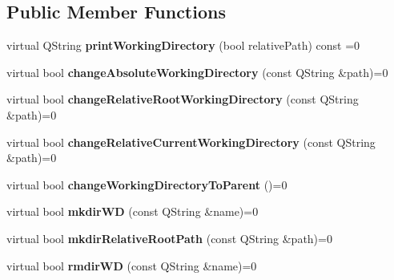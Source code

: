\subsection*{Public Member Functions}
\begin{DoxyCompactItemize}
\item 
\mbox{\label{classInterfaceFTPfileSystem_a99df9cb164e909a24b6c9ec353b220ea}} 
virtual Q\+String {\bfseries print\+Working\+Directory} (bool relative\+Path) const =0
\item 
\mbox{\label{classInterfaceFTPfileSystem_a8b51dbfdb53344cd868547fff3d8f066}} 
virtual bool {\bfseries change\+Absolute\+Working\+Directory} (const Q\+String \&path)=0
\item 
\mbox{\label{classInterfaceFTPfileSystem_a385969b025d97d5bbc2c9d620ea41c11}} 
virtual bool {\bfseries change\+Relative\+Root\+Working\+Directory} (const Q\+String \&path)=0
\item 
\mbox{\label{classInterfaceFTPfileSystem_a0db5681012b9b09873043a2f84de180c}} 
virtual bool {\bfseries change\+Relative\+Current\+Working\+Directory} (const Q\+String \&path)=0
\item 
\mbox{\label{classInterfaceFTPfileSystem_a3a5704f8e6c964923426047bdef1cb33}} 
virtual bool {\bfseries change\+Working\+Directory\+To\+Parent} ()=0
\item 
\mbox{\label{classInterfaceFTPfileSystem_a1b4df812b4251df5d0928c11576d6132}} 
virtual bool {\bfseries mkdir\+WD} (const Q\+String \&name)=0
\item 
\mbox{\label{classInterfaceFTPfileSystem_ab6758fa3bfaa9d47b9d20cec84b8e141}} 
virtual bool {\bfseries mkdir\+Relative\+Root\+Path} (const Q\+String \&path)=0
\item 
\mbox{\label{classInterfaceFTPfileSystem_a15f1107934dfa3ebdee659bb350495d8}} 
virtual bool {\bfseries rmdir\+WD} (const Q\+String \&name)=0
\item 
\mbox{\label{classInterfaceFTPfileSystem_a275dd61645adb1912af078f27e4ff167}} 

\end{DoxyCompactItemize}
